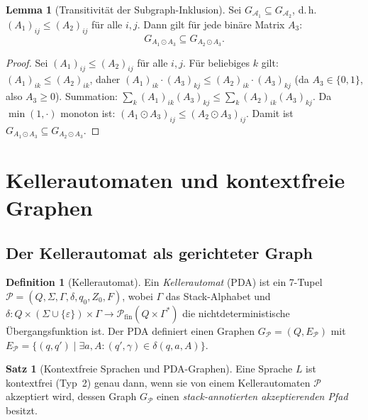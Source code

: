 ﻿\documentclass[a4paper,12pt]{article}
\theoremstyle{definition}
\newtheorem{definition}{Definition}
\newtheorem{satz}{Satz}
\newtheorem{lemma}{Lemma}
\begin{document}
\begin{lemma}[Transitivit\"at der Subgraph-Inklusion]
\label{lem:trans}
Sei $G_{\mathcal{A}_1} \subseteq G_{\mathcal{A}_2}$, d.\,h.\ $(A_1)_{ij} \leq (A_2)_{ij}$
f\"ur alle $i,j$. Dann gilt f\"ur jede bin\"are Matrix $A_3$:
\[
G_{A_1 \odot A_3} \subseteq G_{A_2 \odot A_3}.
\]
\end{lemma}

\begin{proof}
Sei $(A_1)_{ij} \leq (A_2)_{ij}$ f\"ur alle $i, j$. F\"ur beliebiges $k$ gilt:
$(A_1)_{ik} \leq (A_2)_{ik}$, daher $(A_1)_{ik} \cdot (A_3)_{kj} \leq (A_2)_{ik} \cdot (A_3)_{kj}$
(da $A_3 \in \{0,1\}$, also $A_3 \geq 0$).
Summation: $\sum_k (A_1)_{ik}(A_3)_{kj} \leq \sum_k (A_2)_{ik}(A_3)_{kj}$.
Da $\min(1, \cdot)$ monoton ist:
$(A_1 \odot A_3)_{ij} \leq (A_2 \odot A_3)_{ij}$.
Damit ist $G_{A_1 \odot A_3} \subseteq G_{A_2 \odot A_3}$.
\end{proof}

\section{Kellerautomaten und kontextfreie Graphen}

\subsection{Der Kellerautomat als gerichteter Graph}

\begin{definition}[Kellerautomat]
Ein \emph{Kellerautomat} (PDA) ist ein 7-Tupel
$\mathcal{P} = (Q, \Sigma, \Gamma, \delta, q_0, Z_0, F)$, wobei
$\Gamma$ das Stack-Alphabet und
$\delta: Q \times (\Sigma \cup \{\varepsilon\}) \times \Gamma \to
\mathcal{P}_{\mathrm{fin}}(Q \times \Gamma^*)$
die nichtdeterministische \"Ubergangsfunktion ist.
Der PDA definiert einen Graphen
$G_{\mathcal{P}} = (Q, E_{\mathcal{P}})$ mit
$E_{\mathcal{P}} = \{(q,q') \mid \exists a,A: (q',\gamma) \in \delta(q,a,A)\}$.
\end{definition}

\begin{satz}[Kontextfreie Sprachen und PDA-Graphen]
\label{satz:pda}
Eine Sprache $L$ ist kontextfrei (Typ~2) genau dann, wenn sie von einem
Kellerautomaten $\mathcal{P}$ akzeptiert wird, dessen Graph $G_{\mathcal{P}}$
einen \emph{stack-annotierten akzeptierenden Pfad} besitzt.
\end{satz}
\end{document}
